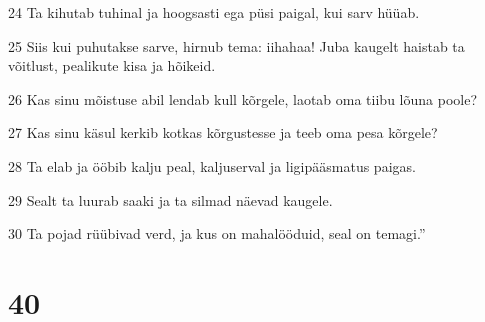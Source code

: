\par 24 Ta kihutab tuhinal ja hoogsasti ega püsi paigal, kui sarv hüüab.
\par 25 Siis kui puhutakse sarve, hirnub tema: iihahaa! Juba kaugelt haistab ta võitlust, pealikute kisa ja hõikeid.
\par 26 Kas sinu mõistuse abil lendab kull kõrgele, laotab oma tiibu lõuna poole?
\par 27 Kas sinu käsul kerkib kotkas kõrgustesse ja teeb oma pesa kõrgele?
\par 28 Ta elab ja ööbib kalju peal, kaljuserval ja ligipääsmatus paigas.
\par 29 Sealt ta luurab saaki ja ta silmad näevad kaugele.
\par 30 Ta pojad rüübivad verd, ja kus on mahalööduid, seal on temagi.”

\chapter{40}

